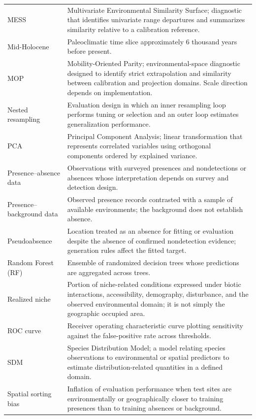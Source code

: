 \begin{longtable}{p{}p{}}
MESS & Multivariate Environmental Similarity Surface; diagnostic that identifies univariate range departures and summarizes similarity relative to a calibration reference. \\
Mid-Holocene & Paleoclimatic time slice approximately 6 thousand years before present. \\
MOP & Mobility-Oriented Parity; environmental-space diagnostic designed to identify strict extrapolation and similarity between calibration and projection domains. Scale direction depends on implementation. \\
Nested resampling & Evaluation design in which an inner resampling loop performs tuning or selection and an outer loop estimates generalization performance. \\
PCA & Principal Component Analysis; linear transformation that represents correlated variables using orthogonal components ordered by explained variance. \\
Presence--absence data & Observations with surveyed presences and nondetections or absences whose interpretation depends on survey and detection design. \\
Presence--background data & Observed presence records contrasted with a sample of available environments; the background does not establish absence. \\
Pseudoabsence & Location treated as an absence for fitting or evaluation despite the absence of confirmed nondetection evidence; generation rules affect the fitted target. \\
Random Forest (RF) & Ensemble of randomized decision trees whose predictions are aggregated across trees. \\
Realized niche & Portion of niche-related conditions expressed under biotic interactions, accessibility, demography, disturbance, and the observed environmental domain; it is not simply the geographic occupied area. \\
ROC curve & Receiver operating characteristic curve plotting sensitivity against the false-positive rate across thresholds. \\
SDM & Species Distribution Model; a model relating species observations to environmental or spatial predictors to estimate distribution-related quantities in a defined domain. \\
Spatial sorting bias & Inflation of evaluation performance when test sites are environmentally or geographically closer to training presences than to training absences or background. \\

\end{longtable}
